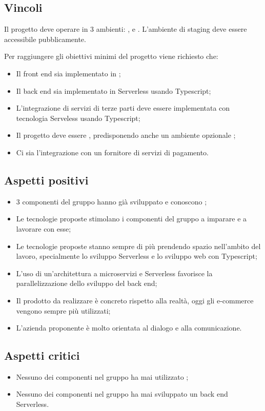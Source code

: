 \subsection{Vincoli}
Il progetto deve operare in 3 ambienti: ,  e . L'ambiente di staging deve essere accessibile pubblicamente.

Per raggiungere gli obiettivi minimi del progetto viene richiesto che:
\begin{itemize}
	\item Il front end sia implementato in ;
	\item Il back end sia implementato in Serverless usando Typescript;
	\item L'integrazione di servizi di terze parti deve essere implementata con tecnologia Serveless usando Typescript;
	\item Il progetto deve essere , predisponendo anche un ambiente opzionale ;
	\item Ci sia l'integrazione con un fornitore di servizi di pagamento.
\end{itemize}

\subsection{Aspetti positivi}
\begin{itemize}
	\item 3 componenti del gruppo hanno già sviluppato e conoscono ;
	\item Le tecnologie proposte stimolano i componenti del gruppo a imparare e a lavorare con esse;
	\item Le tecnologie proposte stanno sempre di più prendendo spazio nell'ambito del lavoro, specialmente lo sviluppo Serverless e lo sviluppo web con Typescript;
	\item L'uso di un'architettura a microservizi e Serverless favorisce la parallelizzazione dello sviluppo del back end;
	\item Il prodotto da realizzare è concreto rispetto alla realtà, oggi gli e-commerce vengono sempre più utilizzati;
	\item L'azienda proponente è molto orientata al dialogo e alla comunicazione.
\end{itemize}

\subsection{Aspetti critici}
\begin{itemize}
	\item Nessuno dei componenti nel gruppo ha mai utilizzato ;
	\item Nessuno dei componenti nel gruppo ha mai sviluppato un back end Serverless.
\end{itemize}


